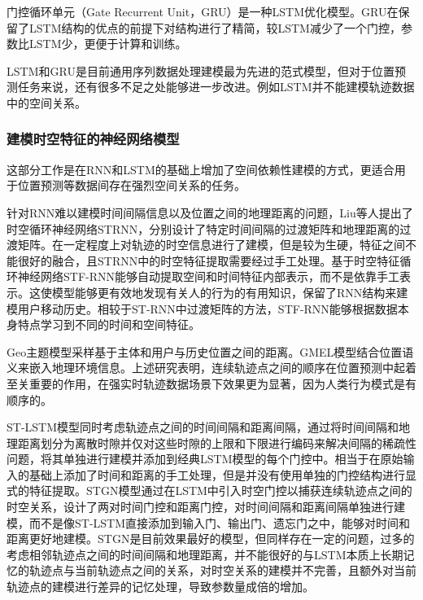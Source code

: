 \documentclass[master]{thesis-uestc}
\begin{document}
门控循环单元（Gate Recurrent Unit，GRU）是一种LSTM优化模型。GRU在保留了LSTM结构的优点的前提下对结构进行了精简，较LSTM减少了一个门控，参数比LSTM少，更便于计算和训练。

LSTM和GRU是目前通用序列数据处理建模最为先进的范式模型，但对于位置预测任务来说，还有很多不足之处能够进一步改进。例如LSTM并不能建模轨迹数据中的空间关系。

\subsubsection{建模时空特征的神经网络模型}
这部分工作是在RNN和LSTM的基础上增加了空间依赖性建模的方式，更适合用于位置预测等数据间存在强烈空间关系的任务。

针对RNN难以建模时间间隔信息以及位置之间的地理距离的问题，Liu等人提出了时空循环神经网络STRNN，分别设计了特定时间间隔的过渡矩阵和地理距离的过渡矩阵。在一定程度上对轨迹的时空信息进行了建模，但是较为生硬，特征之间不能很好的融合，且STRNN中的时空特征提取需要经过手工处理。基于时空特征循环神经网络STF-RNN能够自动提取空间和时间特征内部表示，而不是依靠手工表示。这使模型能够更有效地发现有关人的行为的有用知识，保留了RNN结构来建模用户移动历史。相较于ST-RNN中过渡矩阵的方法，STF-RNN能够根据数据本身特点学习到不同的时间和空间特征。

Geo主题模型采样基于主体和用户与历史位置之间的距离。GMEL模型结合位置语义来嵌入地理环境信息。上述研究表明，连续轨迹点之间的顺序在位置预测中起着至关重要的作用，在强实时轨迹数据场景下效果更为显著，因为人类行为模式是有顺序的。

ST-LSTM模型同时考虑轨迹点之间的时间间隔和距离间隔，通过将时间间隔和地理距离划分为离散时隙并仅对这些时隙的上限和下限进行编码来解决间隔的稀疏性问题，将其单独进行建模并添加到经典LSTM模型的每个门控中。相当于在原始输入的基础上添加了时间和距离的手工处理，但是并没有使用单独的门控结构进行显式的特征提取。STGN模型通过在LSTM中引入时空门控以捕获连续轨迹点之间的时空关系，设计了两对时间门控和距离门控，对时间间隔和距离间隔单独进行建模，而不是像ST-LSTM直接添加到输入门、输出门、遗忘门之中，能够对时间和距离更好地建模。STGN是目前效果最好的模型，但同样存在一定的问题，过多的考虑相邻轨迹点之间的时间间隔和地理距离，并不能很好的与LSTM本质上长期记忆的轨迹点与当前轨迹点之间的关系，对时空关系的建模并不完善，且额外对当前轨迹点的建模进行差异的记忆处理，导致参数量成倍的增加。
\end{document}
